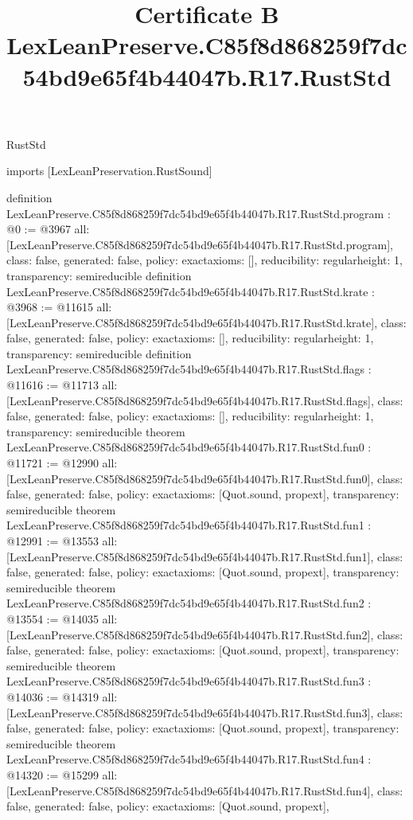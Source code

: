 \begin{lexlean}{RustStd}
\title{Certificate B LexLeanPreserve.C85f8d868259f7dc54bd9e65f4b44047b.R17.RustStd}
\begin{coremodule}
imports [LexLeanPreservation.RustSound]

definition LexLeanPreserve.C85f8d868259f7dc54bd9e65f4b44047b.R17.RustStd.program : @0 := @3967 {
  all: [LexLeanPreserve.C85f8d868259f7dc54bd9e65f4b44047b.R17.RustStd.program],
  class: false,
  generated: false,
  policy: exact{axioms: []},
  reducibility: regular{height: 1},
  transparency: semireducible
}
definition LexLeanPreserve.C85f8d868259f7dc54bd9e65f4b44047b.R17.RustStd.krate : @3968 := @11615 {
  all: [LexLeanPreserve.C85f8d868259f7dc54bd9e65f4b44047b.R17.RustStd.krate],
  class: false,
  generated: false,
  policy: exact{axioms: []},
  reducibility: regular{height: 1},
  transparency: semireducible
}
definition LexLeanPreserve.C85f8d868259f7dc54bd9e65f4b44047b.R17.RustStd.flags : @11616 := @11713 {
  all: [LexLeanPreserve.C85f8d868259f7dc54bd9e65f4b44047b.R17.RustStd.flags],
  class: false,
  generated: false,
  policy: exact{axioms: []},
  reducibility: regular{height: 1},
  transparency: semireducible
}
theorem LexLeanPreserve.C85f8d868259f7dc54bd9e65f4b44047b.R17.RustStd.fun0 : @11721 := @12990 {
  all: [LexLeanPreserve.C85f8d868259f7dc54bd9e65f4b44047b.R17.RustStd.fun0],
  class: false,
  generated: false,
  policy: exact{axioms: [Quot.sound, propext]},
  transparency: semireducible
}
theorem LexLeanPreserve.C85f8d868259f7dc54bd9e65f4b44047b.R17.RustStd.fun1 : @12991 := @13553 {
  all: [LexLeanPreserve.C85f8d868259f7dc54bd9e65f4b44047b.R17.RustStd.fun1],
  class: false,
  generated: false,
  policy: exact{axioms: [Quot.sound, propext]},
  transparency: semireducible
}
theorem LexLeanPreserve.C85f8d868259f7dc54bd9e65f4b44047b.R17.RustStd.fun2 : @13554 := @14035 {
  all: [LexLeanPreserve.C85f8d868259f7dc54bd9e65f4b44047b.R17.RustStd.fun2],
  class: false,
  generated: false,
  policy: exact{axioms: [Quot.sound, propext]},
  transparency: semireducible
}
theorem LexLeanPreserve.C85f8d868259f7dc54bd9e65f4b44047b.R17.RustStd.fun3 : @14036 := @14319 {
  all: [LexLeanPreserve.C85f8d868259f7dc54bd9e65f4b44047b.R17.RustStd.fun3],
  class: false,
  generated: false,
  policy: exact{axioms: [Quot.sound, propext]},
  transparency: semireducible
}
theorem LexLeanPreserve.C85f8d868259f7dc54bd9e65f4b44047b.R17.RustStd.fun4 : @14320 := @15299 {
  all: [LexLeanPreserve.C85f8d868259f7dc54bd9e65f4b44047b.R17.RustStd.fun4],
  class: false,
  generated: false,
  policy: exact{axioms: [Quot.sound, propext]},
}
\end{coremodule}
\end{lexlean}
